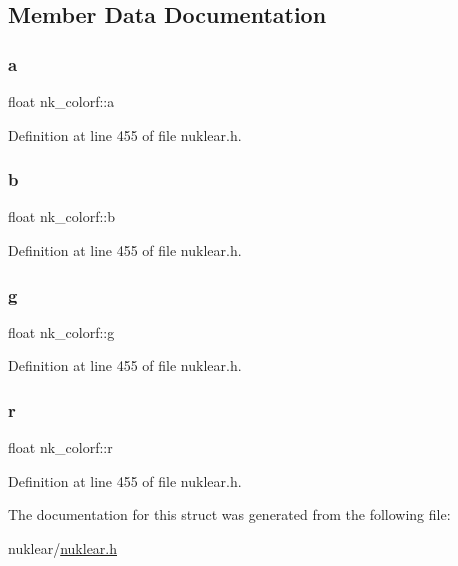 \subsection{Member Data Documentation}
\mbox{\label{structnk__colorf_aff9db540076346a2563bab0d7cd9ef86}} 
\subsubsection{\texorpdfstring{a}{a}}
{\footnotesize\ttfamily float nk\+\_\+colorf\+::a}



Definition at line 455 of file nuklear.\+h.

\mbox{\label{structnk__colorf_a616fe0dea8242077a5f13bc0296bde85}} 
\subsubsection{\texorpdfstring{b}{b}}
{\footnotesize\ttfamily float nk\+\_\+colorf\+::b}



Definition at line 455 of file nuklear.\+h.

\mbox{\label{structnk__colorf_a41ff42d9dce5f1812132b305cf3395fb}} 
\subsubsection{\texorpdfstring{g}{g}}
{\footnotesize\ttfamily float nk\+\_\+colorf\+::g}



Definition at line 455 of file nuklear.\+h.

\mbox{\label{structnk__colorf_a19908af2a694aa5dd2f0d045b5bc69c1}} 
\subsubsection{\texorpdfstring{r}{r}}
{\footnotesize\ttfamily float nk\+\_\+colorf\+::r}



Definition at line 455 of file nuklear.\+h.



The documentation for this struct was generated from the following file\+:\begin{DoxyCompactItemize}
\item 
nuklear/\mbox{\hyperlink{nuklear_8h}{nuklear.\+h}}\end{DoxyCompactItemize}
